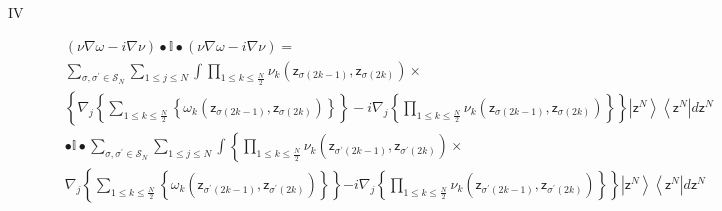 \documentclass[aps,preprint]{revtex4}%
\begin{document}
\begin{description}
\item[IV]
\begin{align}
&  \left(  \nu\nabla\omega-i\nabla\nu\right)  \bullet\mathbb{I}\bullet\left(
\nu\nabla\omega-i\nabla\nu\right)  \left.  =\right. \nonumber\\
&
{\textstyle\sum\limits_{\sigma,\sigma^{\prime}\in\mathcal{S}_{N}}}
{\displaystyle\sum\limits_{1\leq j\leq N}}
\int%
{\displaystyle\prod\limits_{1\leq k\leq\frac{N}{2}}}
\nu_{k}\left(  \mathsf{z}_{\sigma\left(  2k-1\right)  },\mathsf{z}%
_{\sigma\left(  2k\right)  }\right)  \times\nonumber\\
&  \left\{  \nabla_{j}\left\{
{\displaystyle\sum\limits_{1\leq k\leq\frac{N}{2}}}
\left\{  \omega_{k}\left(  \mathsf{z}_{\sigma\left(  2k-1\right)  }%
,\mathsf{z}_{\sigma\left(  2k\right)  }\right)  \right\}  \right\}
-i\nabla_{j}\left\{
{\displaystyle\prod\limits_{1\leq k\leq\frac{N}{2}}}
\nu_{k}\left(  \mathsf{z}_{\sigma\left(  2k-1\right)  },\mathsf{z}%
_{\sigma\left(  2k\right)  }\right)  \right\}  \right\}  \left\vert
\mathsf{z}^{N}\right\rangle \left\langle \mathsf{z}^{N}\right\vert
d\mathsf{z}^{N}\nonumber\\
&  \bullet\mathbb{I}\bullet%
{\textstyle\sum\limits_{\sigma,\sigma^{\prime}\in\mathcal{S}_{N}}}
{\displaystyle\sum\limits_{1\leq j\leq N}}
\int\left\{
{\displaystyle\prod\limits_{1\leq k\leq\frac{N}{2}}}
\nu_{k}\left(  \mathsf{z}_{\sigma^{\prime}\left(  2k-1\right)  }%
,\mathsf{z}_{\sigma^{\prime}\left(  2k\right)  }\right)  \right.  \times\\
&  \nabla_{j}\left\{
{\displaystyle\sum\limits_{1\leq k\leq\frac{N}{2}}}
\left\{  \omega_{k}\left(  \mathsf{z}_{\sigma^{\prime}\left(  2k-1\right)
},\mathsf{z}_{\sigma^{\prime}\left(  2k\right)  }\right)  \right\}  \right\}
\left.  -i\nabla_{j}\left\{
{\displaystyle\prod\limits_{1\leq k\leq\frac{N}{2}}}
\nu_{k}\left(  \mathsf{z}_{\sigma^{\prime}\left(  2k-1\right)  }%
,\mathsf{z}_{\sigma^{\prime}\left(  2k\right)  }\right)  \right\}  \right\}
\left\vert \mathsf{z}^{N}\right\rangle \left\langle \mathsf{z}^{N}\right\vert
d\mathsf{z}^{N}%
\end{align}

\end{description}
\end{document}
